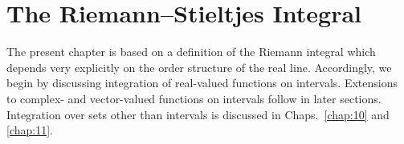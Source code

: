 \chapter{The Riemann--Stieltjes Integral}

The present chapter is based on a definition of the Riemann integral which depends very explicitly on the order structure of the real line. Accordingly, we begin by discussing integration of real-valued functions on intervals. Extensions to complex- and vector-valued functions on intervals follow in later sections. Integration over sets other than intervals is discussed in Chaps.~\ref{chap:10} and \ref{chap:11}.










